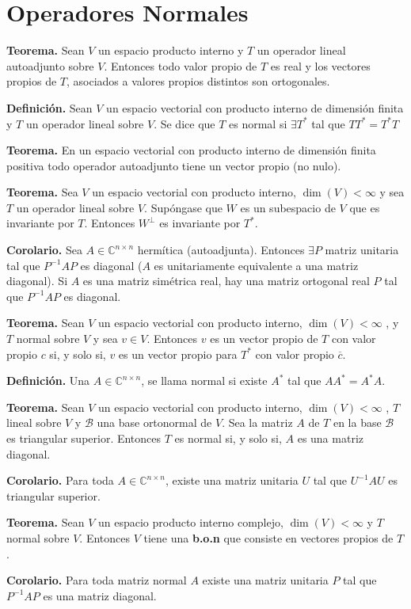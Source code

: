 \newpage
\section{Operadores Normales}
\textbf{Teorema.} Sean $V$ un espacio producto interno y $T$ un
operador lineal autoadjunto sobre $V$. Entonces todo valor propio
de $T$ es real y los vectores propios de $T$, asociados a valores
propios distintos son ortogonales.

\textbf{Definición.} Sean $V$ un espacio vectorial con producto
interno de dimensión finita y $T$ un operador lineal sobre $V$.
Se dice que $T$ es normal si $\exists T^{\ast}$ tal que
$TT^{\ast} = T^{\ast}T$

\textbf{Teorema.} En un espacio vectorial con producto interno
de dimensión finita positiva todo operador autoadjunto tiene
un vector propio (no nulo).

\textbf{Teorema.} Sea $V$ un espacio vectorial con producto interno, $\dim(V) < \infty$  y sea $T$ un operador lineal sobre $V$.
Supóngase que $W$ es un subespacio de $V$ que es invariante
por $T$. Entonces $W^{\bot}$ es invariante por $T^{\ast}$.

\textbf{Corolario.} Sea $A\in \mathbb{C}^{n\times n}$ hermítica
(autoadjunta). Entonces $\exists P$ matriz unitaria tal que
$P^{-1}AP$ es diagonal ($A$ es unitariamente equivalente a una
matriz diagonal). Si $A$ es una matriz simétrica real, hay una
matriz ortogonal real $P$ tal que $P^{-1}AP$ es diagonal.

\textbf{Teorema.} Sean $V$ un espacio vectorial con producto
interno, $\dim(V) < \infty$ , y $T$ normal sobre $V$
y sea $v \in V$. Entonces $v$ es un vector propio de $T$ con
valor propio $c$ si, y solo si, $v$ es un vector
propio para $T^{\ast}$ con valor propio $\overline{c}$.

\textbf{Definición.} Una $A\in \mathbb{C}^{n\times n}$, se llama
normal si existe $A^{\ast}$ tal que $AA^{\ast} = A^{\ast}A$.

\textbf{Teorema.} Sean $V$ un espacio vectorial con producto interno,
$\dim(V) < \infty$ , $T$ lineal sobre $V$ y $\mathcal{B}$
una base ortonormal de $V$. Sea la matriz $A$ de $T$ en la
base $\mathcal{B}$ es triangular superior. Entonces $T$ es normal si,
y solo si, $A$ es una matriz diagonal.

\textbf{Corolario.} Para toda $A\in \mathbb{C}^{n\times n}$,
existe una matriz unitaria $U$ tal que $U^{-1}AU$ es
triangular superior.

\textbf{Teorema.} Sean $V$ un espacio producto interno complejo, 
$\dim(V) < \infty$ y $T$ normal sobre $V$. Entonces $V$ tiene una
\textbf{b.o.n} que consiste en vectores propios de $T$.

\textbf{Corolario.} Para toda matriz normal $A$ existe una matriz unitaria
$P$ tal que $P^{-1}AP$ es una matriz diagonal.